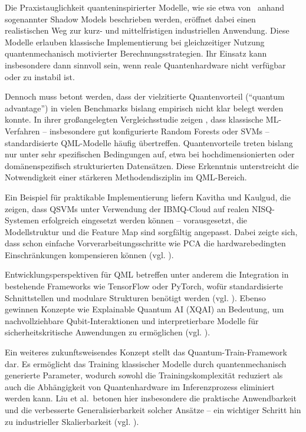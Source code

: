 Die Praxistauglichkeit quanteninspirierter Modelle, wie sie etwa von \cite{jerbiShadowsQuantumMachine2024} \ anhand sogenannter Shadow Models beschrieben werden, eröffnet dabei einen realistischen Weg zur kurz- und mittelfristigen industriellen Anwendung. Diese Modelle erlauben klassische Implementierung bei gleichzeitiger Nutzung quantenmechanisch motivierter Berechnungsstrategien. Ihr Einsatz kann insbesondere dann sinnvoll sein, wenn reale Quantenhardware nicht verfügbar oder zu instabil ist.

Dennoch muss betont werden, dass der vielzitierte Quantenvorteil (``quantum advantage'') in vielen Benchmarks bislang empirisch nicht klar belegt werden konnte. In ihrer großangelegten Vergleichsstudie zeigen \cite{bowlesBetterClassicalSubtle2024}, dass klassische ML-Verfahren – insbesondere gut konfigurierte Random Forests oder SVMs – standardisierte QML-Modelle häufig übertreffen. Quantenvorteile treten bislang nur unter sehr spezifischen Bedingungen auf, etwa bei hochdimensionierten oder domänenspezifisch strukturierten Datensätzen. Diese Erkenntnis unterstreicht die Notwendigkeit einer stärkeren Methodendisziplin im QML-Bereich.

Ein Beispiel für praktikable Implementierung liefern Kavitha und Kaulgud, die zeigen, dass QSVMs unter Verwendung der IBMQ-Cloud auf realen NISQ-Systemen erfolgreich eingesetzt werden können – vorausgesetzt, die Modellstruktur und die Feature Map sind sorgfältig angepasst. Dabei zeigte sich, dass schon einfache Vorverarbeitungsschritte wie PCA die hardwarebedingten Einschränkungen kompensieren können (vgl. \cite{kavithaQuantumMachineLearning2024}).

Entwicklungsperspektiven für QML betreffen unter anderem die Integration in bestehende Frameworks wie TensorFlow oder PyTorch, wofür standardisierte Schnittstellen und modulare Strukturen benötigt werden (vgl. \cite{gujjuQuantumMachineLearning2024}).
Ebenso gewinnen Konzepte wie Explainable Quantum AI (XQAI) an Bedeutung, um nachvollziehbare Qubit-Interaktionen und interpretierbare Modelle für sicherheitskritische Anwendungen zu ermöglichen (vgl. \cite{jerbiShadowsQuantumMachine2024}).

Ein weiteres zukunftsweisendes Konzept stellt das Quantum-Train-Framework dar. Es ermöglicht das Training klassischer Modelle durch quantenmechanisch generierte Parameter, wodurch sowohl die Trainingskomplexität reduziert als auch die Abhängigkeit von Quantenhardware im Inferenzprozess eliminiert werden kann. Liu et al.\ betonen hier insbesondere die praktische Anwendbarkeit und die verbesserte Generalisierbarkeit solcher Ansätze – ein wichtiger Schritt hin zu industrieller Skalierbarkeit (vgl. \cite{liuQuantumTrainRethinkingHybrid2024}).

